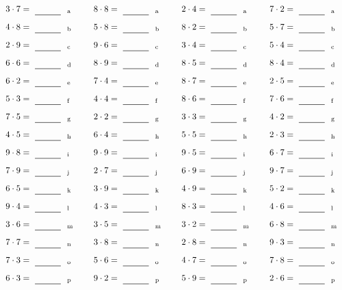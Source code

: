 \documentclass
[
  draft    = true,
  fontsize = 11pt,
  parskip  = half-
]
{scrartcl}
\begin{document}
\par\vfill\par
\begin{align*}
    \pline{3\cdot7}&=\rline{a}
  & \pline{8\cdot8}&=\rline{a}
  & \pline{2\cdot4}&=\rline{a}
  & \pline{7\cdot2}&=\rline{a} \\[1ex]
    \pline{4\cdot8}&=\rline{b}
  & \pline{5\cdot8}&=\rline{b}
  & \pline{8\cdot2}&=\rline{b}
  & \pline{5\cdot7}&=\rline{b} \\[1ex]
    \pline{2\cdot9}&=\rline{c}
  & \pline{9\cdot6}&=\rline{c}
  & \pline{3\cdot4}&=\rline{c}
  & \pline{5\cdot4}&=\rline{c} \\[1ex]
    \pline{6\cdot6}&=\rline{d}
  & \pline{8\cdot9}&=\rline{d}
  & \pline{8\cdot5}&=\rline{d}
  & \pline{8\cdot4}&=\rline{d} \\[1ex]
    \pline{6\cdot2}&=\rline{e}
  & \pline{7\cdot4}&=\rline{e}
  & \pline{8\cdot7}&=\rline{e}
  & \pline{2\cdot5}&=\rline{e} \\[1ex]
    \pline{5\cdot3}&=\rline{f}
  & \pline{4\cdot4}&=\rline{f}
  & \pline{8\cdot6}&=\rline{f}
  & \pline{7\cdot6}&=\rline{f} \\[1ex]
    \pline{7\cdot5}&=\rline{g}
  & \pline{2\cdot2}&=\rline{g}
  & \pline{3\cdot3}&=\rline{g}
  & \pline{4\cdot2}&=\rline{g} \\[1ex]
    \pline{4\cdot5}&=\rline{h}
  & \pline{6\cdot4}&=\rline{h}
  & \pline{5\cdot5}&=\rline{h}
  & \pline{2\cdot3}&=\rline{h} \\[1ex]
    \pline{9\cdot8}&=\rline{i}
  & \pline{9\cdot9}&=\rline{i}
  & \pline{9\cdot5}&=\rline{i}
  & \pline{6\cdot7}&=\rline{i} \\[1ex]
    \pline{7\cdot9}&=\rline{j}
  & \pline{2\cdot7}&=\rline{j}
  & \pline{6\cdot9}&=\rline{j}
  & \pline{9\cdot7}&=\rline{j} \\[1ex]
    \pline{6\cdot5}&=\rline{k}
  & \pline{3\cdot9}&=\rline{k}
  & \pline{4\cdot9}&=\rline{k}
  & \pline{5\cdot2}&=\rline{k} \\[1ex]
    \pline{9\cdot4}&=\rline{l}
  & \pline{4\cdot3}&=\rline{l}
  & \pline{8\cdot3}&=\rline{l}
  & \pline{4\cdot6}&=\rline{l} \\[1ex]
    \pline{3\cdot6}&=\rline{m}
  & \pline{3\cdot5}&=\rline{m}
  & \pline{3\cdot2}&=\rline{m}
  & \pline{6\cdot8}&=\rline{m} \\[1ex]
    \pline{7\cdot7}&=\rline{n}
  & \pline{3\cdot8}&=\rline{n}
  & \pline{2\cdot8}&=\rline{n}
  & \pline{9\cdot3}&=\rline{n} \\[1ex]
    \pline{7\cdot3}&=\rline{o}
  & \pline{5\cdot6}&=\rline{o}
  & \pline{4\cdot7}&=\rline{o}
  & \pline{7\cdot8}&=\rline{o} \\[1ex]
    \pline{6\cdot3}&=\rline{p}
  & \pline{9\cdot2}&=\rline{p}
  & \pline{5\cdot9}&=\rline{p}
  & \pline{2\cdot6}&=\rline{p}
\end{align*}
\end{document}
